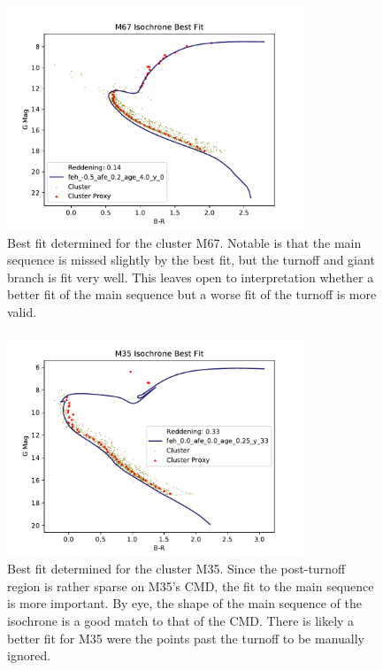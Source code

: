 \documentclass[aps,prb,twocolumn,groupedaddress,nofootinbib,floatfix]{revtex4-1}
\begin{document}
\begin{figure}[!h]
	\centering
      \includegraphics[width=3.5in]{M67_CMD_Iso_BestFit.pdf}
	\caption{Best fit determined for the cluster M67. Notable is that the main sequence is missed slightly by the best fit, but the turnoff and giant branch is fit very well. This leaves open to interpretation whether a better fit of the main sequence but a worse fit of the turnoff is more valid.}
	\label{fig:M67_iso_best_fit}
\end{figure}

\begin{figure}[!h]
	\centering
      \includegraphics[width=3.5in]{M35_CMD_Iso_BestFit.pdf}
	\caption{Best fit determined for the cluster M35. Since the post-turnoff region is rather sparse on M35's CMD, the fit to the main sequence is more important. By eye, the shape of the main sequence of the isochrone is a good match to that of the CMD. There is likely a better fit for M35 were the points past the turnoff to be manually ignored.}
	\label{fig:M35_iso_best_fit}
\end{figure} 
\end{document}
